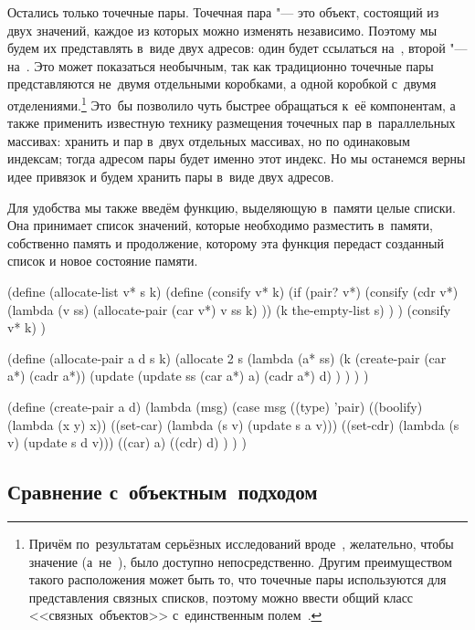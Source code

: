 Остались только точечные пары. Точечная пара "--- это объект, состоящий из
двух значений, каждое из которых можно изменять независимо. Поэтому мы будем их
представлять в~виде двух адресов: один будет ссылаться на~, второй "---
на~. Это может показаться необычным, так как традиционно точечные пары
представляются не~двумя отдельными коробками, а одной коробкой с~двумя
отделениями.\footnote*{Причём по~результатам серьёзных исследований
вроде~\cite{cla79,cg77}, желательно, чтобы значение  (а~не~),
было доступно непосредственно. Другим преимуществом такого расположения может
быть то, что точечные пары используются для представления связных списков,
поэтому можно ввести общий класс <<связных~объектов>> с~единственным
полем~.} Это~бы позволило чуть быстрее обращаться к~её компонентам, а
также применить известную технику размещения точечных пар в~параллельных
массивах: хранить  и  пар в~двух отдельных массивах, но по
одинаковым индексам; тогда адресом пары будет именно этот индекс. Но мы
останемся верны идее привязок и будем хранить пары в~виде двух адресов.

Для удобства мы также введём функцию, выделяющую в~памяти целые списки. Она
принимает список значений, которые необходимо разместить в~памяти, собственно
память и продолжение, которому эта функция передаст созданный список и новое
состояние памяти.

\begin{code:lisp}
(define (allocate-list v* s k)
  (define (consify v* k)
    (if (pair? v*)
        (consify (cdr v*) (lambda (v ss)
                            (allocate-pair (car v*) v ss k) ))
        (k the-empty-list s) ) )
  (consify v* k) )

(define (allocate-pair a d s k)
  (allocate 2 s
   (lambda (a* ss)
     (k (create-pair (car a*) (cadr a*))
        (update (update ss (car a*) a) (cadr a*) d) ) ) ) )

(define (create-pair a d)
  (lambda (msg)
    (case msg
      ((type)    'pair)
      ((boolify) (lambda (x y) x))
      ((set-car) (lambda (s v) (update s a v)))
      ((set-cdr) (lambda (s v) (update s d v)))
      ((car)     a)
      ((cdr)     d) ) ) )
\end{code:lisp}


\subsection{Сравнение с~объектным~подходом}%
\label{assignment/implementation/ssect:cmp-to-oop}

